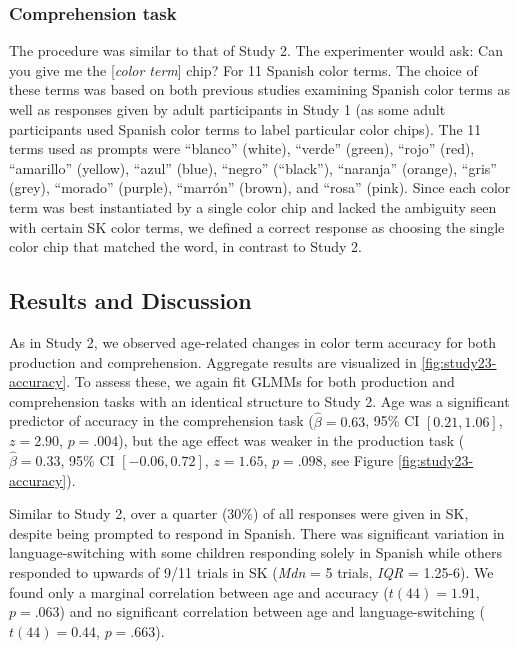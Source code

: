 \documentclass[
  english,
  ,man,floatsintext]{apa6}
\begin{document}
\hypertarget{comprehension-task-1}{%
\subsubsection{Comprehension task}\label{comprehension-task-1}}

The procedure was similar to that of Study 2. The experimenter would ask: Can you give me the {[}\emph{color term}{]} chip? For 11 Spanish color terms. The choice of these terms was based on both previous studies examining Spanish color terms as well as responses given by adult participants in Study 1 (as some adult participants used Spanish color terms to label particular color chips). The 11 terms used as prompts were \enquote{blanco} (white), \enquote{verde} (green), \enquote{rojo} (red), \enquote{amarillo} (yellow), \enquote{azul} (blue), \enquote{negro} (\enquote{black}), \enquote{naranja} (orange), \enquote{gris} (grey), \enquote{morado} (purple), \enquote{marrón} (brown), and \enquote{rosa} (pink). Since each color term was best instantiated by a single color chip and lacked the ambiguity seen with certain SK color terms, we defined a correct response as choosing the single color chip that matched the word, in contrast to Study 2.

\hypertarget{results-and-discussion-2}{%
\subsection{Results and Discussion}\label{results-and-discussion-2}}

As in Study 2, we observed age-related changes in color term accuracy for both production and comprehension. Aggregate results are visualized in \ref{fig:study23-accuracy}. To assess these, we again fit GLMMs for both production and comprehension tasks with an identical structure to Study 2. Age was a significant predictor of accuracy in the comprehension task (\(\hat{\beta} = 0.63\), 95\% CI \([0.21, 1.06]\), \(z = 2.90\), \(p = .004\)), but the age effect was weaker in the production task (\(\hat{\beta} = 0.33\), 95\% CI \([-0.06, 0.72]\), \(z = 1.65\), \(p = .098\), see Figure \ref{fig:study23-accuracy}).

Similar to Study 2, over a quarter (30\%) of all responses were given in SK, despite being prompted to respond in Spanish. There was significant variation in language-switching with some children responding solely in Spanish while others responded to upwards of 9/11 trials in SK (\emph{Mdn} = 5 trials, \emph{IQR} = 1.25-6). We found only a marginal correlation between age and accuracy (\(t(44) = 1.91\), \(p = .063\)) and no significant correlation between age and language-switching (\(t(44) = 0.44\), \(p = .663\)).
\end{document}
